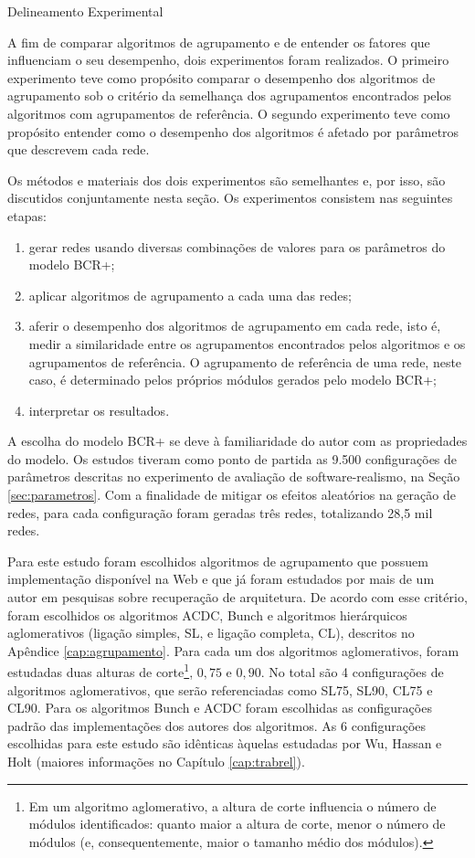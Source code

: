 \begin{section}{Delineamento Experimental}
	
	A fim de comparar algoritmos de agrupamento e de entender os fatores que influenciam o seu desempenho, dois experimentos foram realizados. O primeiro experimento teve como propósito comparar o desempenho dos algoritmos de agrupamento sob o critério da semelhança dos agrupamentos encontrados pelos algoritmos com agrupamentos de referência. O segundo experimento teve como propósito entender como o desempenho dos algoritmos é afetado por parâmetros que descrevem cada rede.
	
	Os métodos e materiais dos dois experimentos são semelhantes e, por isso, são discutidos conjuntamente nesta seção. Os experimentos consistem nas seguintes etapas: 
\begin{enumerate}
	\item gerar redes usando diversas combinações de valores para os parâmetros do modelo BCR+;
	\item aplicar algoritmos de agrupamento a cada uma das redes;
	\item aferir o desempenho dos algoritmos de agrupamento em cada rede, isto é, medir a similaridade entre os agrupamentos encontrados pelos algoritmos e os agrupamentos de referência. O agrupamento de referência de uma rede, neste caso, é determinado pelos próprios módulos gerados pelo modelo BCR+;
	\item interpretar os resultados.
\end{enumerate}

	A escolha do modelo BCR+ se deve à familiaridade do autor com as propriedades do modelo. Os estudos tiveram como ponto de partida as 9.500 configurações de parâmetros descritas no experimento de avaliação de software-realismo, na Seção \ref{sec:parametros}. Com a finalidade de mitigar os efeitos aleatórios na geração de redes, para cada configuração foram geradas três redes, totalizando 28,5 mil redes.

	Para este estudo foram escolhidos algoritmos de agrupamento que possuem implementação disponível na Web e que já foram estudados por mais de um autor em pesquisas sobre recuperação de arquitetura. De acordo com esse critério, foram escolhidos os algoritmos ACDC, Bunch e algoritmos hierárquicos aglomerativos (ligação simples, SL, e ligação completa, CL), descritos no Apêndice \ref{cap:agrupamento}. Para cada um dos algoritmos aglomerativos, foram estudadas duas alturas de corte\footnote{Em um algoritmo aglomerativo, a altura de corte influencia o número de módulos identificados: quanto maior a altura de corte, menor o número de módulos (e, consequentemente, maior o tamanho médio dos módulos).}, $0,75$ e $0,90$. No total são 4 configurações de algoritmos aglomerativos, que serão referenciadas como SL75, SL90, CL75 e CL90. Para os algoritmos Bunch e ACDC foram escolhidas as configurações padrão das implementações dos autores dos algoritmos. As 6 configurações escolhidas para este estudo são idênticas àquelas estudadas por Wu, Hassan e Holt \cite{Wu2005} (maiores informações no Capítulo \ref{cap:trabrel}).
	

\end{section}

